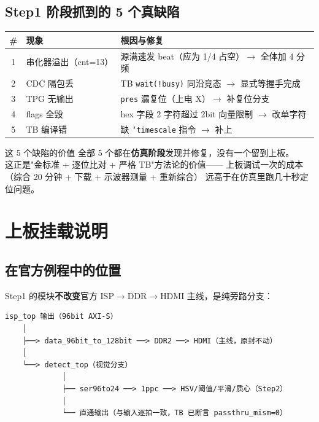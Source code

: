 \subsection{Step1 阶段抓到的 5 个真缺陷}

\begin{center}
\renewcommand{\arraystretch}{1.25}
\begin{tabular}{clp{7.5cm}}
\toprule
\textbf{\#} & \textbf{现象} & \textbf{根因与修复} \\
\midrule
1 & 串化器溢出（cnt=13） & 源满速发 beat（应为 1/4 占空）$\to$ 全体加 4 分频 \\
2 & CDC 隔包丢 & TB \texttt{wait(!busy)} 同沿竞态 $\to$ 显式等握手完成 \\
3 & TPG 无输出 & \texttt{pres} 漏复位（上电 X）$\to$ 补复位分支 \\
4 & flags 全毁 & hex 字段 2 字符超过 2bit 向量限制 $\to$ 改单字符 \\
5 & TB 编译错 & 缺 \texttt{`timescale} 指令 $\to$ 补上 \\
\bottomrule
\end{tabular}
\end{center}

\begin{okbox}{这 5 个缺陷的价值}
全部 5 个都在\textbf{仿真阶段}发现并修复，没有一个留到上板。\\[4pt]
这正是"金标准 + 逐位比对 + 严格 TB"方法论的价值——
上板调试一次的成本（综合 20 分钟 + 下载 + 示波器测量 + 重新综合）
远高于在仿真里跑几十秒定位问题。
\end{okbox}

\section{上板挂载说明}

\subsection{在官方例程中的位置}

Step1 的模块\textbf{不改变}官方 ISP$\to$DDR$\to$HDMI 主线，是纯旁路分支：

\begin{Verbatim}[frame=single,fontsize=\small]
isp_top 输出（96bit AXI-S）
    │
    ├──> data_96bit_to_128bit ──> DDR2 ──> HDMI（主线，原封不动）
    │
    └──> detect_top（视觉分支）
             │
             ├── ser96to24 ──> 1ppc ──> HSV/阈值/平滑/质心（Step2）
             │
             └── 直通输出（与输入逐拍一致，TB 已断言 passthru_mism=0）
\end{Verbatim}

